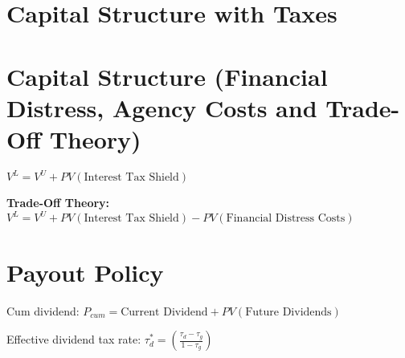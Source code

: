 \documentclass{report}
\begin{document}
\section{Capital Structure with Taxes}
\label{sec:capit-struct-2}

 \section{Capital Structure (Financial Distress, Agency Costs and Trade-Off Theory)}
\label{sec:capit-struct-3}

$V^L=V^U+PV(\mbox{Interest Tax Shield})$

\textbf{Trade-Off Theory:} $V^L = V^U + PV(\mbox{Interest Tax Shield}) - PV(\mbox{Financial Distress Costs})$
 
\section{Payout Policy}
\label{sec:payout-policy}

Cum dividend: $P_{cum}=\mbox{Current Dividend} + PV(\mbox{Future Dividends})$

Effective dividend tax rate: $\tau_d^*=(\frac{\tau_d-\tau_g}{1-\tau_g})$

 
\end{document}
